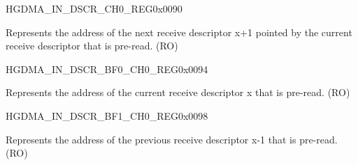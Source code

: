 \begin{register}{H}{GDMA\_IN\_DSCR\_CH0\_REG}{0x0090}\label{regdesc:GDMAINDSCRCH0REG}
%
\regnewline%
\begin{regdesc}\begin{reglist}
\label{fielddesc:GDMAINLINKDSCRCH0}\item [GDMA\_INLINK\_DSCR\_CH0] Represents the address of the next receive descriptor x+1 pointed by the current receive descriptor that is pre-read. (RO)
\end{reglist}\end{regdesc}
\end{register}


\begin{register}{H}{GDMA\_IN\_DSCR\_BF0\_CH0\_REG}{0x0094}\label{regdesc:GDMAINDSCRBF0CH0REG}
%
\regnewline%
\begin{regdesc}\begin{reglist}
\label{fielddesc:GDMAINLINKDSCRBF0CH0}\item [GDMA\_INLINK\_DSCR\_BF0\_CH0] Represents the address of the current receive descriptor x that is pre-read. (RO)
\end{reglist}\end{regdesc}
\end{register}


\begin{register}{H}{GDMA\_IN\_DSCR\_BF1\_CH0\_REG}{0x0098}\label{regdesc:GDMAINDSCRBF1CH0REG}
%
\regnewline%
\begin{regdesc}\begin{reglist}
\label{fielddesc:GDMAINLINKDSCRBF1CH0}\item [GDMA\_INLINK\_DSCR\_BF1\_CH0] Represents the address of the previous receive descriptor x-1 that is pre-read. (RO)
\end{reglist}\end{regdesc}
\end{register}


